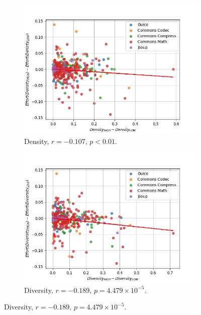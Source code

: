 \documentclass[twoside,a4paper,11pt]{memoir}
\begin{document}
\begin{figure}
    \centering
    \begin{subfigure}[b]{0.49\linewidth}
        \centering
        \includegraphics[width=\linewidth]{figures/delta_density_delta_effort}
        \caption{Density, $r=-0.107$, $p<0.01$.}
        \label{fig:delta_density_delta_effort}
    \end{subfigure}
    \hfill
    \begin{subfigure}[b]{0.49\linewidth}
        \centering
        \includegraphics[width=\linewidth]{figures/delta_diversity_delta_effort}
        \caption{Diversity, $r=-0.189$, $p = 4.479\times10^{-5}$.}
        \label{fig:delta_diversity_delta_effort}
    \end{subfigure}

\end{figure}
\end{document}
